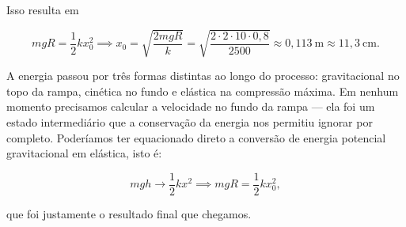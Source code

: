 \begin{exemplo}[Nível II]
Isso resulta em

\begin{equation*}
    mgR = \frac{1}{2}kx_0^2
    \implies x_0 = \sqrt{\frac{2mgR}{k}}
    = \sqrt{\frac{2 \cdot 2 \cdot 10 \cdot 0{,}8}{2500}}
    \approx 0{,}113\ \text{m} \approx 11{,}3\ \text{cm}.
\end{equation*}










A energia passou por três formas distintas ao longo do processo: gravitacional no
topo da rampa, cinética no fundo e elástica na compressão máxima. Em nenhum momento
precisamos calcular a velocidade no fundo da rampa --- ela foi um estado
intermediário que a conservação da energia nos permitiu ignorar por completo. Poderíamos ter equacionado direto a conversão de energia potencial gravitacional em elástica, isto é:

$$ mgh \to \dfrac{1}{2}kx^2 \implies mgR = \dfrac{1}{2}kx_0^2,$$

\noindent que foi justamente o resultado final que chegamos.

\end{exemplo}


